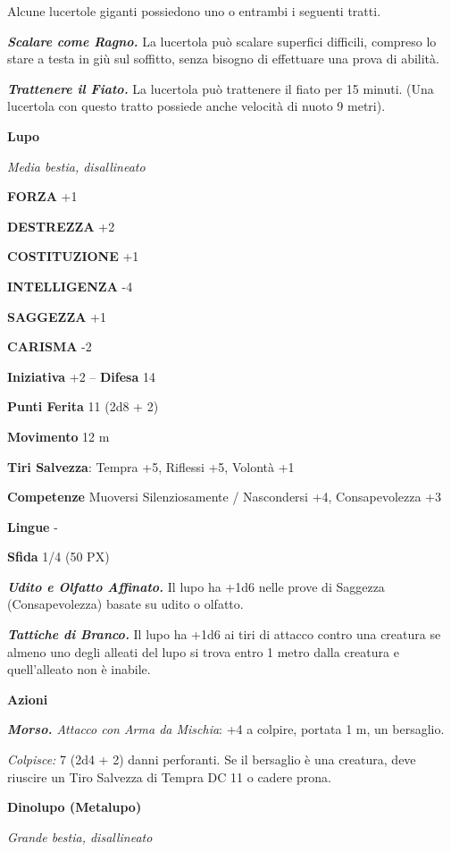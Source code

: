 \begin{multicols}{2}
	Alcune lucertole giganti possiedono uno o entrambi i seguenti tratti.

	\textit{\textbf{Scalare come Ragno.}} La lucertola può scalare superfici difficili, compreso lo stare a testa in giù sul soffitto, senza bisogno di effettuare una prova di abilità.

	\textit{\textbf{Trattenere il Fiato.}} La lucertola può trattenere il fiato per 15 minuti. (Una lucertola con questo tratto possiede anche velocità di nuoto 9 metri).

	\medskip\textbf{Lupo}

	\textit{Media bestia, disallineato}

	\textbf{FORZA} +1

	\textbf{DESTREZZA} +2

	\textbf{COSTITUZIONE} +1

	\textbf{INTELLIGENZA} -4

	\textbf{SAGGEZZA} +1

	\textbf{CARISMA} -2

	\textbf{Iniziativa} +2 -- \textbf{Difesa} 14

	\textbf{Punti Ferita} 11 (2d8 + 2)

	\textbf{Movimento} 12 m

	\textbf{Tiri Salvezza}: Tempra +5, Riflessi +5, Volontà +1

	\textbf{Competenze} Muoversi Silenziosamente / Nascondersi +4, Consapevolezza +3

	\textbf{Lingue} -

	\textbf{Sfida} 1/4 (50 PX)

	\textit{\textbf{Udito e Olfatto Affinato.}} Il lupo ha +1d6 nelle prove di Saggezza (Consapevolezza) basate su udito o olfatto.

	\textit{\textbf{Tattiche di Branco.}} Il lupo ha +1d6 ai tiri di attacco contro una creatura se almeno uno degli alleati del lupo si trova entro 1 metro dalla creatura e quell'alleato non è inabile.

	\textbf{Azioni}

	\textit{\textbf{Morso.} Attacco con Arma da Mischia}: +4 a colpire, portata 1 m, un bersaglio.

	\textit{Colpisce:} 7 (2d4 + 2) danni perforanti. Se il bersaglio è una creatura, deve riuscire un Tiro Salvezza di Tempra DC 11 o cadere prona.

	\medskip\textbf{Dinolupo (Metalupo)}

	\textit{Grande bestia, disallineato}


\end{multicols}
